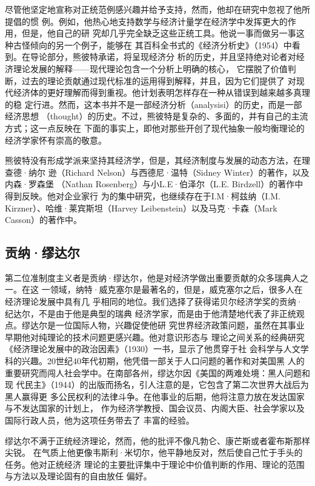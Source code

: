 尽管他坚定地宣称对正统范例感兴趣并给予支持，然而，他却在研究中忽视了他所提倡的惯
例。例如，他热心地支持数学与经济计量学在经济学中发挥更大的作用，但是，他自己的研
究却几乎完全缺乏这些正统工具。他说一事而做另一事这种古怪倾向的另一个例子，能够在
其百科全书式的《经济分析史》（1954）中看到。在导论部分，熊彼特承诺，将呈现经济分
析的历史，并且坚持绝对论者对经济理论发展的解释——现代理论包含一个分析上明确的核心，
它摆脱了价值判断，过去的理论贡献通过现代标准的运用得到解释，并且，因为它们提供了
对现代经济体的更好理解而得到重视。他计划表明怎样存在一种从错误到越来越多真理的稳
定行进。然而，这本书并不是一部经济分析（analysisi）的历史，而是一部经济思想
（thought）的历史。不过，熊彼特是复杂的、多面的，并有自己的主流方式；这一点反映在
下面的事实上，即他对那些开创了现代抽象一般均衡理论的经济学家怀有崇高的敬意。

熊彼特没有形成学派来坚持其经济学，但是，其经济制度与发展的动态方法，在理查德·纳尔
逊（Richard Nelson）与西德尼·温特（Sidney Winter）的著作，以及内森·罗森堡
（Nathan Rosenberg）与小L.E·伯泽尔（L.E. Birdzell）的著作中得到反映。他对企业家行
为的集中研究，也继续存在于I.M·柯兹纳（I.M. Kirzner）、哈维·莱宾斯坦（Harvey
Leibenstein）以及马克·卡森（Mark Casson）的著作中。

\subsection{贡纳·缪达尔}

第二位准制度主义者是贡纳·缪达尔，他是对经济学做出重要贡献的众多瑞典人之一。在这
一领域，纳特·威克塞尔是最著名的，但是，威克塞尔之后，很多人在经济理论发展中具有几
乎相同的地位。我们选择了获得诺贝尔经济学奖的贡纳·纪达尔，不是由于他是典型的瑞典
经济学家，而是由于他清楚地代表了非正统观点。缪达尔是一位国际人物，兴趣促使他研
究世界经济政策问题，虽然在其事业早期他对纯理论的技术问题更感兴趣。他对意识形态与
理论之间关系的经典研究《经济理论发展中的政治因素》（1930）一书，显示了他贯穿于社
会科学与人文学科的兴趣。20世纪40年代初期，他凭借一部关于人口问题的著作和对美国黑
人的重要研究而闯人社会学中。在南部各州，缪达尔因《美国的两难处境：黑人问题和现
代民主》（1944）的出版而扬名，引人注意的是，它包含了第二次世界大战后为黑人赢得更
多公民权利的法律斗争。在他事业的后期，他将注意力放在发达国家与不发达国家的计划上，
作为经济学教授、国会议员、内阁大臣、社会学家以及国际行政人员，他为这项任务带去了
丰富的经验。

缪达尔不满于正统经济理论，然而，他的批评不像凡勃仑、康芒斯或者霍布斯那样尖锐。
在气质上他更像韦斯利·米切尔，他平静地反对，然后使自己忙于手头的任务。他对正统经济
理论的主要批评集中于理论中价值判断的作用、理论的范围与方法以及理论固有的自由放任
偏好。


